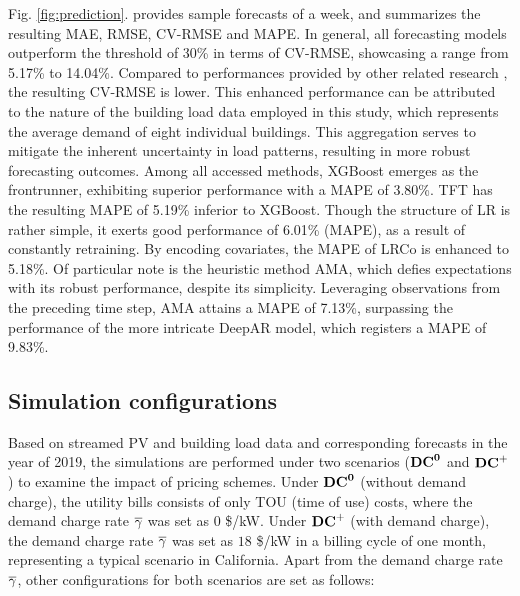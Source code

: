 Fig. \ref{fig:prediction}. provides sample forecasts of a week, and summarizes the resulting MAE, RMSE, CV-RMSE and MAPE. In general, all forecasting models outperform the threshold of 30\% in terms of CV-RMSE, showcasing a range from 5.17\% to 14.04\%. Compared to performances provided by other related research \cite{hourly_building_cooling_load_pred}, the resulting CV-RMSE is lower. This enhanced performance can be attributed to the nature of the building load data employed in this study, which represents the average demand of eight individual buildings. This aggregation serves to mitigate the inherent uncertainty in load patterns, resulting in more robust forecasting outcomes.
Among all accessed methods, XGBoost emerges as the frontrunner, exhibiting superior performance with a MAPE of 3.80\%. TFT has the resulting MAPE of 5.19\% inferior to XGBoost. Though the structure of LR is rather simple, it exerts good performance of 6.01\% (MAPE), as a result of constantly retraining. By encoding covariates, the MAPE of LRCo is enhanced to 5.18\%. Of particular note is the heuristic method AMA, which defies expectations with its robust performance, despite its simplicity. Leveraging observations from the preceding time step, AMA attains a MAPE of 7.13\%, surpassing the performance of the more intricate DeepAR model, which registers a MAPE of 9.83\%.

\subsection{Simulation configurations}
\label{section:configurations}
Based on streamed PV and building load data and corresponding forecasts in the year of 2019, the simulations are performed under two scenarios ($\mathbf{{DC}^{0}}$ and $\mathbf{{DC}^{+}}$) to examine the impact of pricing schemes. Under $\mathbf{{DC}^{0}}$ (without demand charge), the utility bills consists of only TOU (time of use) costs, where the demand charge rate $\overline{\gamma}$ was set as $0$ \$/kW. Under $\mathbf{{DC}^{+}}$ (with demand charge), the demand charge rate $\overline{\gamma}$ was set as $18$ \$/kW in a billing cycle of one month, representing a typical scenario in California. Apart from the demand charge rate $\overline{\gamma}$, other configurations for both scenarios are set as follows: 
 

